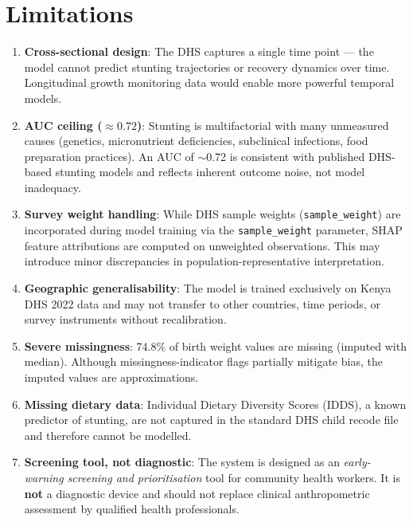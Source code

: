 \documentclass[12pt, a4paper]{article}
\begin{document}
\section{Limitations}

\begin{enumerate}
    \item \textbf{Cross-sectional design}: The DHS captures a single time point — the model cannot predict stunting trajectories or recovery dynamics over time. Longitudinal growth monitoring data would enable more powerful temporal models.
    
    \item \textbf{AUC ceiling ($\approx 0.72$)}: Stunting is multifactorial with many unmeasured causes (genetics, micronutrient deficiencies, subclinical infections, food preparation practices). An AUC of $\sim$0.72 is consistent with published DHS-based stunting models and reflects inherent outcome noise, not model inadequacy.
    
    \item \textbf{Survey weight handling}: While DHS sample weights (\texttt{sample\_weight}) are incorporated during model training via the \texttt{sample\_weight} parameter, SHAP feature attributions are computed on unweighted observations. This may introduce minor discrepancies in population-representative interpretation.
    
    \item \textbf{Geographic generalisability}: The model is trained exclusively on Kenya DHS 2022 data and may not transfer to other countries, time periods, or survey instruments without recalibration.
    
    \item \textbf{Severe missingness}: 74.8\% of birth weight values are missing (imputed with median). Although missingness-indicator flags partially mitigate bias, the imputed values are approximations.
    
    \item \textbf{Missing dietary data}: Individual Dietary Diversity Scores (IDDS), a known predictor of stunting, are not captured in the standard DHS child recode file and therefore cannot be modelled.
    
    \item \textbf{Screening tool, not diagnostic}: The system is designed as an \emph{early-warning screening and prioritisation} tool for community health workers. It is \textbf{not} a diagnostic device and should not replace clinical anthropometric assessment by qualified health professionals.
\end{enumerate}
\end{document}
